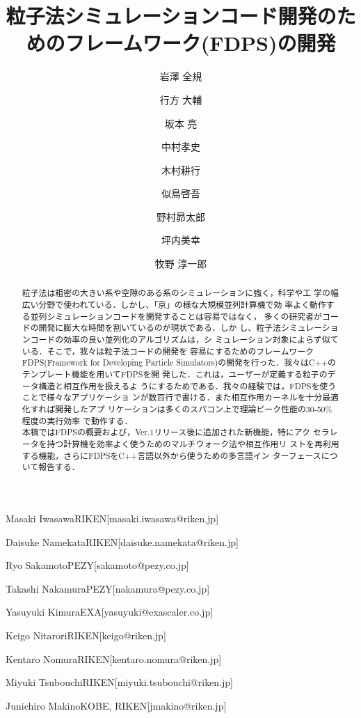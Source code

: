 \documentclass[submit]{ipsj}
\begin{document}
\title{粒子法シミュレーションコード開発のためのフレームワーク(FDPS)の開発}









\author{岩澤 全規}{Masaki Iwasawa}{RIKEN}[masaki.iwasawa@riken.jp]
\author{行方 大輔}{Daisuke Namekata}{RIKEN}[daisuke.namekata@riken.jp]
\author{坂本 亮}{Ryo Sakamoto}{PEZY}[sakamoto@pezy.co.jp]
\author{中村孝史}{Takashi Nakamura}{PEZY}[nakamura@pezy.co.jp]
\author{木村耕行}{Yasuyuki Kimura}{EXA}[yasuyuki@exascaler.co.jp]
\author{似鳥啓吾}{Keigo Nitarori}{RIKEN}[keigo@riken.jp]
\author{野村昴太郎}{Kentaro Nomura}{RIKEN}[kentaro.nomura@riken.jp]
\author{坪内美幸}{Miyuki Tsubouchi}{RIKEN}[miyuki.tsubouchi@riken.jp]
\author{牧野 淳一郎}{Junichiro Makino}{KOBE, RIKEN}[jmakino@riken.jp]

\begin{abstract}

粒子法は粗密の大きい系や空隙のある系のシミュレーションに強く，科学や工
学の幅広い分野で使われている．しかし、「京」の様な大規模並列計算機で効
率よく動作する並列シミュレーションコードを開発することは容易ではなく，
多くの研究者がコードの開発に膨大な時間を割いているのが現状である．しか
し、粒子法シミュレーションコードの効率の良い並列化のアルゴリズムは，シ
ミュレーション対象によらず似ている．そこで，我々は粒子法コードの開発を
容易にするためのフレームワークFDPS(Framework for Developing Particle
Simulators)の開発を行った．我々はC++のテンプレート機能を用いてFDPSを開
発した．これは，ユーザーが定義する粒子のデータ構造と相互作用を扱えるよ
うにするためである．我々の経験では，FDPSを使うことで様々なアプリケーショ
ンが数百行で書ける．また相互作用カーネルを十分最適化すれば開発したアプ
リケーションは多くのスパコン上で理論ピーク性能の30-50\%程度の実行効率
で動作する．\\

本稿ではFDPSの概要および，Ver.1リリース後に追加された新機能，特にアク
セラレータを持つ計算機を効率よく使うためのマルチウォーク法や相互作用リ
ストを再利用する機能，さらにFDPSをC++言語以外から使うための多言語イン
ターフェースについて報告する．

\end{abstract}
\end{document}
